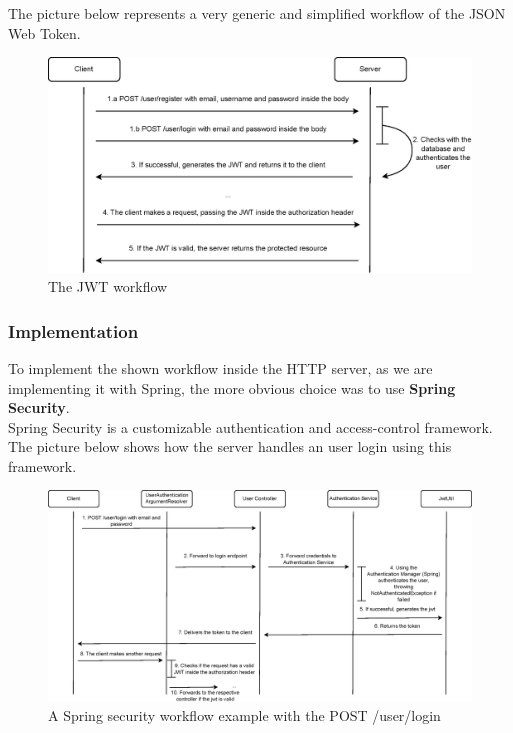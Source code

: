 The picture below represents a very generic and simplified workflow of the JSON Web Token. 

\begin{figure}[H]
    \begin{center}
        \includegraphics[scale=0.9]{_figures/JWT-simple-diagram.eps}
        \caption{The JWT workflow}
    \end{center}
\end{figure}

\subsubsection{Implementation}

To implement the shown workflow inside the HTTP server, as we are implementing it with Spring, the more obvious choice was to use \textbf{Spring Security}\cite{springsecurity}.\\

Spring Security is a customizable authentication and access-control framework.\\

The picture below shows how the server handles an user login using this framework.\\

\begin{figure}[H]
    \begin{center}
        \includegraphics[scale=0.60]{_figures/Spring-jwt-diagram.eps}
        \caption{A Spring security workflow example with the POST /user/login}
    \end{center}
\end{figure}


